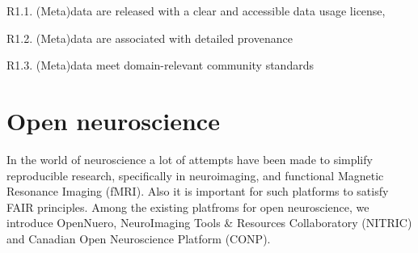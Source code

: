 \quad R1.1. (Meta)data are released with a clear and accessible data usage license,



\quad R1.2. (Meta)data are associated with detailed provenance


\quad R1.3. (Meta)data meet domain-relevant community standards




\section{Open neuroscience}
In the world of neuroscience a lot of attempts have been
 made to simplify reproducible research, specifically in neuroimaging, and functional Magnetic Resonance Imaging (fMRI)\cite{Schottner_2020}. Also it is important for such platforms to satisfy FAIR principles. Among the existing platfroms for open neuroscience, we introduce OpenNuero, NeuroImaging Tools \& Resources Collaboratory (NITRIC) and Canadian Open Neuroscience Platform (CONP).


